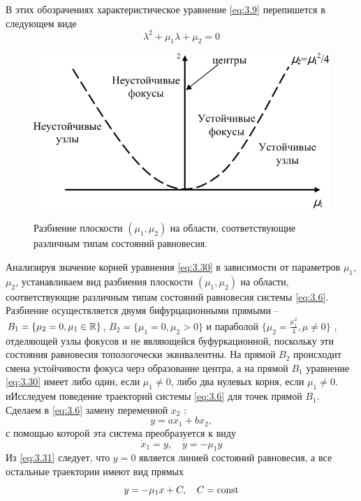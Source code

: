 В этих обозрачениях характеристическое уравнение \eqref{eq:3.9} перепишется в следующем виде
\begin{equation}
        \label{eq:3.30}
       \lambda^2 + \mu_1 \lambda + \mu_2 =0 
\end{equation}
\begin{figure}[h!]
        \centering
        \includegraphics[scale=1]{fig/lect3/8}
        \label{fig:3.8}
        \caption{Разбиение плоскости $(\mu_1,\mu_2)$ на области, соответствующие различным типам состояний равновесия.}
\end{figure}
Анализируя значение корней уравнения \eqref{eq:3.30} в зависимости от параметров $\mu_1$, $\mu_2$, устанавливаем вид разбиения плоскости $( \mu_1, \mu_2)$ на области, соответствующие различным типам состояний равновесия системы \eqref{eq:3.6}. Разбиение осуществляется двумя бифурцационными прямыми --$B_1 = \{ \mu_2=0, \mu_1 \in \mathbb{R} \}$, $B_2=\{\mu_1=0, \mu_2>0\}$ и параболой $\{ \mu_2= \frac{\mu_1^2}{4}, \mu \neq 0 \}   $
, отделяющей узлы фокусов и не являющейся буфуркационной, поскольку эти состояния равновесия топологочески эквивалентны. На прямой $B_2$ происходит смена устойчивости фокуса черз образование центра, а на прямой $B_1$ уравнение \eqref{eq:3.30} имеет либо один, если $\mu_1 \neq 0$, либо два нулевых корня, если $\mu_1\neq 0$. иИсследуем поведение траекторий системы \eqref{eq:3.6} для точек прямой $B_1$. Сделаем в \eqref{eq:3.6} замену переменной $x_2$ :
\begin{equation}
        \label{eq:}
        y= ax_1 + bx_2,
\end{equation}
с помощью которой эта система преобразуется к виду
\begin{equation}
        \label{eq:3.31}
        \dot x_1 = y, \quad \dot y = - \mu_1 y  
\end{equation}
Из \eqref{eq:3.31} следует, что $y=0$ является линией состояний равновесия, а все остальные траектории имеют вид прямых
\begin{equation}
        \label{eq:}
        y= - \mu_1x +C, \quad C=\textrm{const}
\end{equation}

